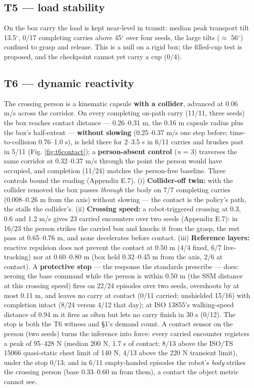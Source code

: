 \subsection{T5 --- load stability}


On the box carry the load is kept near-level in transit: median peak transport tilt 13.5$^{\circ}$, 0/17 completing carries above 45$^{\circ}$ over four seeds, the large tilts ($\approx$ 56$^{\circ}$) confined to grasp and release. This is a null on a rigid box; the filled-cup test is proposed, and the checkpoint cannot yet carry a cup (0/4).


\subsection{T6 --- dynamic reactivity}


The crossing person is a kinematic capsule \textbf{with a collider}, advanced at 0.06 m/s across the corridor. On every completing on-path carry (11/11, three seeds) the box reaches contact distance --- 0.26--0.31 m, the 0.16 m capsule radius plus the box's half-extent --- \textbf{without slowing} (0.25--0.37 m/s one step before; time-to-collision 0.76--1.0 s), is held there for 2--3.5 s in 6/11 carries and brushes past in 5/11 (Fig. \ref{fig:t6contact}); a \textbf{person-absent control} (\emph{n} = 3) traverses the same corridor at 0.32--0.37 m/s through the point the person would have occupied, and completion (11/24) matches the person-free baseline. Three controls bound the reading (Appendix E.7). (i) \textbf{Collider-off twin:} with the collider removed the box passes \emph{through} the body on 7/7 completing carries (0.008--0.26 m from the axis) without slowing --- the contact is the policy's path, the stalls the collider's. (ii) \textbf{Crossing speed:} a robot-triggered crossing at 0.3, 0.6 and 1.2 m/s gives 23 carried encounters over two seeds (Appendix E.7): in 16/23 the person strikes the carried box and knocks it from the grasp, the rest pass at 0.65--0.76 m, and none decelerates before contact. (iii) \textbf{Reference layers:} reactive repulsion does not prevent the contact at 0.50 m (4/4 fixed, 6/7 live-tracking) nor at 0.60--0.80 m (box held 0.32--0.45 m from the axis, 2/6 at contact). A \textbf{protective stop} --- the response the standards prescribe --- does: zeroing the base command while the person is within 0.50 m (the SSM distance at this crossing speed) fires on 22/24 episodes over two seeds, overshoots by at most 0.11 m, and leaves no carry at contact (0/11 carried; unshielded 15/16) with completion intact (8/24 versus 4/12 that day); at ISO 13855's walking-speed distance of 0.94 m it fires as often but lets no carry finish in 30 s (0/12). The stop is both the T6 witness and \S1's demand count. A contact sensor on the person (two seeds) turns the inference into force: every carried encounter registers a peak of 95--428 N (median 200 N, 1.7 s of contact; 8/13 above the ISO/TS 15066 quasi-static chest limit of 140 N, 4/13 above the 220 N transient limit), under the stop 0/13; and in 6/11 empty-handed episodes the robot's \emph{body} strikes the crossing person (base 0.33--0.60 m from them), a contact the object metric cannot see.


